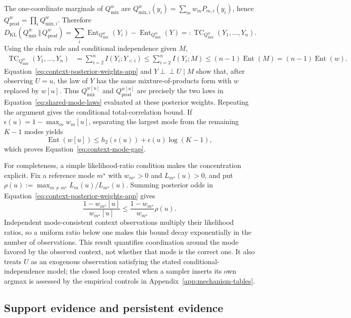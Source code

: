 \documentclass{article}
\newcommand{\KL}{D_{\mathrm{KL}}}
\newcommand{\kldiv}{\,\Vert\,}
\newcommand{\TC}{\operatorname{TC}}
\newcommand{\Ent}{\operatorname{Ent}}
\newcommand{\1}{\mathbf 1}
\theoremstyle{definition}
\begin{document}
The one-coordinate marginals of $Q_{\mathrm{mix}}^w$ are
$Q_{\mathrm{mix},i}^w(y_i)=\sum_m w_mP_{m,i}(y_i)$, hence
$Q_{\mathrm{prod}}^w=\prod_iQ_{\mathrm{mix},i}^w$. Therefore
\begin{equation}
 \KL(Q_{\mathrm{mix}}^w\kldiv Q_{\mathrm{prod}}^w)
 =\sum_i\Ent_{Q_{\mathrm{mix}}^w}(Y_i)
  -\Ent_{Q_{\mathrm{mix}}^w}(Y)
 =:\TC_{Q_{\mathrm{mix}}^w}(Y_1,\ldots,Y_n).
\end{equation}
Using the chain rule and conditional independence given $M$,
\begin{align}
 \TC_{Q_{\mathrm{mix}}^w}(Y_1,\ldots,Y_n)
 &=\sum_{i=2}^n I(Y_i;Y_{<i})
 \le\sum_{i=2}^n I(Y_i;M)
 \le(n-1)\Ent(M)=(n-1)\Ent(w).
\end{align}
Equation~\eqref{eq:context-posterior-weights-app} and
$Y\perp\!\!\!\perp U\mid M$ show that, after observing $U=u$, the law
of $Y$ has the same mixture-of-products form with $w$ replaced by
$w[u]$. Thus $Q_{\mathrm{mix}}^{w[u]}$ and
$Q_{\mathrm{prod}}^{w[u]}$ are precisely
the two laws in Equation~\eqref{eq:shared-mode-laws} evaluated at these
posterior weights. Repeating the argument gives the conditional total-correlation
bound. If $\epsilon(u)=1-\max_m w_m[u]$, separating the largest mode from
the remaining $K-1$ modes yields
\[
 \Ent(w[u])
 \le h_2(\epsilon(u))+\epsilon(u)\log(K-1),
\]
which proves Equation~\eqref{eq:context-mode-gap}.

For completeness, a simple likelihood-ratio condition makes the concentration
explicit. Fix a reference mode $m^\star$ with $w_{m^\star}>0$ and
$L_{m^\star}(u)>0$, and put
$\rho(u):=\max_{m\ne m^\star}L_m(u)/L_{m^\star}(u)$. Summing posterior odds in
Equation~\eqref{eq:context-posterior-weights-app} gives
\begin{equation}
 \frac{1-w_{m^\star}[u]}{w_{m^\star}[u]}
 \le\frac{1-w_{m^\star}}{w_{m^\star}}\rho(u).
 \label{eq:context-posterior-odds-app}
\end{equation}
Independent mode-consistent context observations multiply their likelihood
ratios, so a uniform ratio below one makes this bound decay exponentially in
the number of observations.
This result quantifies coordination around the mode favored by the observed
context, not whether that mode is the correct one. It also treats $U$ as an
exogenous observation satisfying the stated conditional-independence model;
the closed loop created when a sampler inserts its own argmax is assessed by
the empirical controls in Appendix~\ref{app:mechanism-tables}.

\subsection{Support evidence and persistent evidence}
\label{app:combined-evidence}
\end{document}
